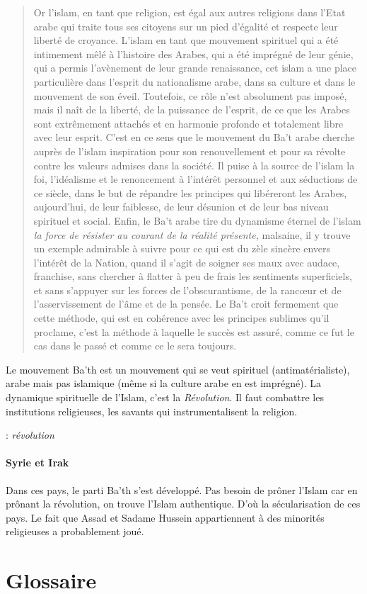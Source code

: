\begin{quote}
Or l'islam, en tant que religion, est égal aux autres religions dans
l'Etat arabe qui traite tous ses citoyens sur un pied d'égalité et
respecte leur liberté de croyance. L'islam en tant que mouvement
spirituel qui a été intimement mêlé à l'histoire des Arabes, qui a été
imprégné de leur génie, qui a permis l'avènement de leur grande
renaissance, cet islam a une place particulière dans l'esprit du
nationalisme arabe, dans sa culture et dans le mouvement de son éveil.
Toutefois, ce rôle n'est absolument pas imposé, mais il naît de la
liberté, de la puissance de l'esprit, de ce que les Arabes sont
extrêmement attachés et en harmonie profonde et totalement libre avec
leur esprit. C'est en ce sens que le mouvement du Ba't arabe cherche
auprès de l'islam inspiration pour son renouvellement et pour sa révolte
contre les valeurs admises dans la société. Il puise à la source de
l'islam la foi, l'idéalisme et le renoncement à l'intérêt personnel et
aux séductions de ce siècle, dans le but de répandre les principes qui
libéreront les Arabes, aujourd'hui, de leur faiblesse, de leur désunion
et de leur bas niveau spirituel et social. Enfin, le Ba't arabe tire du
dynamisme éternel de l'islam\textit{ la force de résister au courant de la
réalité présente,} malsaine, il y trouve un exemple admirable à suivre
pour ce qui est du zèle sincère envers l'intérêt de la Nation, quand il
s'agit de soigner ses maux avec audace, franchise, sans chercher à
flatter à peu de frais les sentiments superficiels, et sans s'appuyer
sur les forces de l'obscurantisme, de la rancœur et de l'asservissement
de l'âme et de la pensée. Le Ba't croit fermement que cette méthode, qui
est en cohérence avec les principes sublimes qu'il proclame, c'est la
méthode à laquelle le succès est assuré, comme ce fut le cas dans le
passé et comme ce le sera toujours.


\end{quote}

\begin{Synthesis}
  Le mouvement Ba'th est un mouvement qui se veut spirituel (antimatérialiste), arabe mais pas islamique (même si la culture arabe en est imprégné).
  La dynamique spirituelle de l'Islam, c'est la \textit{Révolution}. Il faut combattre les institutions religieuses, les savants qui instrumentalisent la religion. 
\end{Synthesis}
 \begin{Def}[inqilâb]  : \emph{révolution}
\end{Def}
\paragraph{Syrie et Irak} Dans ces pays, le parti Ba'th s'est développé. Pas besoin de prôner l'Islam car en prônant la révolution, on trouve l'Islam authentique. D'où la sécularisation de ces pays. Le fait que Assad et Sadame Hussein appartiennent à des minorités religieuses a probablement joué.  
 ~
\hypertarget{glossaire-3}{%
\section{\texorpdfstring{{Glossaire}}{Glossaire}}\label{glossaire-3}}


